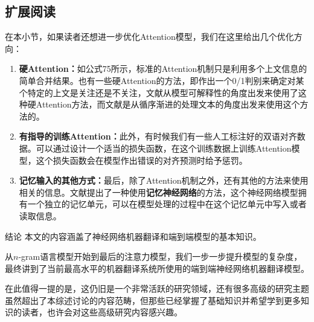 \documentclass[10pt,a4paper]{ctexart}
\makeatletter
\renewcommand{\section}{\@startsection{section}{1}{0mm}
  {-\baselineskip}{0.5\baselineskip}{\bf\leftline}}
\makeatother
\begin{document}
\subsection{扩展阅读}
在本小节，如果读者还想进一步优化Attention模型，我们在这里给出几个优化方向：
\begin{enumerate}
\item[] \textbf{硬Attention：}如公式75所示，标准的Attention机制只是利用多个上文信息的简单合并结果。也有一些硬Attention的方法，即作出一个0/1判别来确定对某个特定的上文是关注还是不关注，文献\cite{lei2016rationalizing}从模型可解释性的角度出发来使用了这种硬Attention方法，而文献\cite{yu2016online,gu2016learning}是从循序渐进的处理文本的角度出发来使用这个方法的。
\item[] \textbf{有指导的训练Attention：}此外，有时候我们有一些人工标注好的双语对齐数据。可以通过设计一个适当的损失函数，在这个训练数据上训练Attention模型，这个损失函数会在模型作出错误的对齐预测时给予惩罚\cite{mi2016supervised}。
\item[] \textbf{记忆输入的其他方式：}最后，除了Attention机制之外，还有其他的方法来使用相关的信息。文献\cite{wang2016memory}提出了一种使用\textbf{记忆神经网络}的方法，这个神经网络模型拥有一个独立的记忆单元，可以在模型处理的过程中在这个记忆单元中写入或者读取信息。
\end{enumerate}


\section{结论}
本文的内容涵盖了神经网络机器翻译和端到端模型的基本知识。

从$n$-gram语言模型开始到最后的注意力模型，我们一步一步提升模型的复杂度，最终讲到了当前最高水平的机器翻译系统所使用的端到端神经网络机器翻译模型。

在此值得一提的是，这仍旧是一个非常活跃的研究领域，还有很多高级的研究主题虽然超出了本综述讨论的内容范畴，但那些已经掌握了基础知识并希望学到更多知识的读者，也许会对这些高级研究内容感兴趣。
\end{document}
